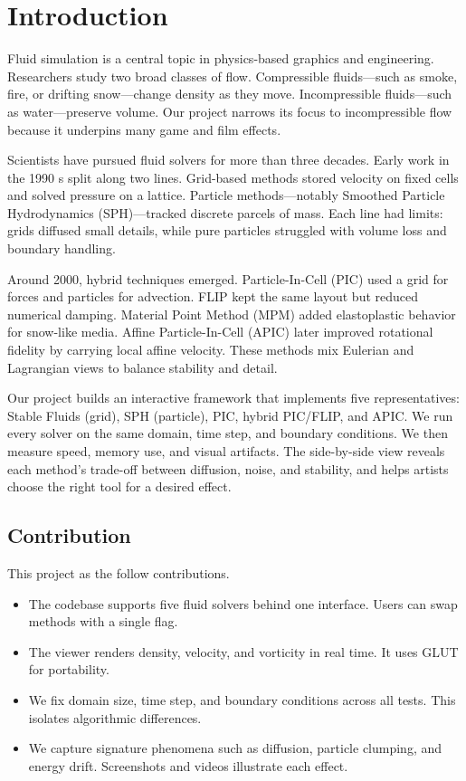 \section{Introduction}

Fluid simulation is a central topic in physics-based graphics and engineering.
Researchers study two broad classes of flow.
Compressible fluids—such as smoke, fire, or drifting snow—change density as they move.
Incompressible fluids—such as water—preserve volume.
Our project narrows its focus to incompressible flow because it underpins many game and film effects.

Scientists have pursued fluid solvers for more than three decades.
Early work in the 1990 s split along two lines. Grid-based methods stored velocity on fixed cells and solved pressure on a lattice.
Particle methods—notably Smoothed Particle Hydrodynamics (SPH)—tracked discrete parcels of mass.
Each line had limits: grids diffused small details, while pure particles struggled with volume loss and boundary handling.

Around 2000, hybrid techniques emerged.
Particle-In-Cell (PIC) used a grid for forces and particles for advection.
FLIP kept the same layout but reduced numerical damping.
Material Point Method (MPM) added elastoplastic behavior for snow-like media.
Affine Particle-In-Cell (APIC) later improved rotational fidelity by carrying local affine velocity.
These methods mix Eulerian and Lagrangian views to balance stability and detail.

Our project builds an interactive framework that implements five representatives: Stable Fluids (grid), SPH (particle), PIC, hybrid PIC/FLIP, and APIC.
We run every solver on the same domain, time step, and boundary conditions. We then measure speed, memory use, and visual artifacts.
The side-by-side view reveals each method's trade-off between diffusion, noise, and stability, and helps artists choose the right tool for a desired effect.


\subsection{Contribution}
This project as the follow contributions.
\begin{itemize}
	\item The codebase supports five fluid solvers behind one interface. Users can swap methods with a single flag.
	\item The viewer renders density, velocity, and vorticity in real time. It uses GLUT for portability.
	\item We fix domain size, time step, and boundary conditions across all tests. This isolates algorithmic differences.
	\item We capture signature phenomena such as diffusion, particle clumping, and energy drift. Screenshots and videos illustrate each effect.
\end{itemize}
